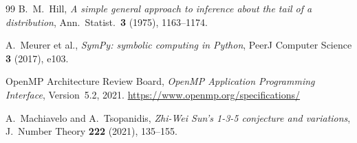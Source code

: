 \documentclass{amsart}
\theoremstyle{definition}
\theoremstyle{remark}
\numberwithin{equation}{section}
\begin{document}
\begin{thebibliography}{99}
B.~M.~Hill,
\textit{A simple general approach to inference about the tail of a
distribution},
Ann.\ Statist.\ \textbf{3} (1975), 1163--1174.

A.~Meurer et al.,
\textit{SymPy: symbolic computing in Python},
PeerJ Computer Science \textbf{3} (2017), e103.

OpenMP Architecture Review Board,
\textit{OpenMP Application Programming Interface}, Version~5.2, 2021.
\url{https://www.openmp.org/specifications/}

A.~Machiavelo and A.~Tsopanidis,
\textit{Zhi-Wei Sun's 1-3-5 conjecture and variations},
J.\ Number Theory \textbf{222} (2021), 135--155.

\end{thebibliography}
\end{document}
